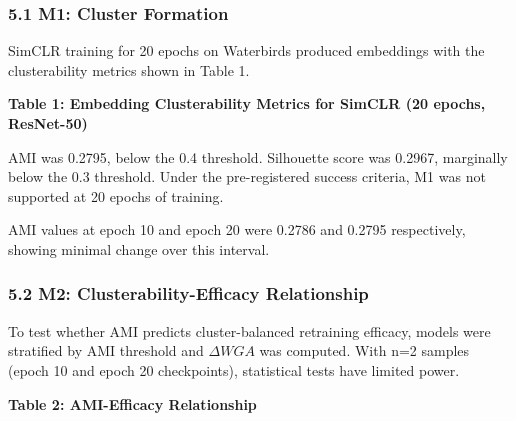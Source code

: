 
\subsubsection{5.1 M1: Cluster Formation}

SimCLR training for 20 epochs on Waterbirds produced embeddings with the clusterability metrics shown in Table 1.

\textbf{Table 1: Embedding Clusterability Metrics for SimCLR (20 epochs, ResNet-50)}

\begin{table}[htbp]
\centering
{}
\end{table}

AMI was 0.2795, below the 0.4 threshold. Silhouette score was 0.2967, marginally below the 0.3 threshold. Under the pre-registered success criteria, M1 was not supported at 20 epochs of training.

AMI values at epoch 10 and epoch 20 were 0.2786 and 0.2795 respectively, showing minimal change over this interval.

\subsubsection{5.2 M2: Clusterability-Efficacy Relationship}

To test whether AMI predicts cluster-balanced retraining efficacy, models were stratified by AMI threshold and $\Delta WGA$ was computed. With n=2 samples (epoch 10 and epoch 20 checkpoints), statistical tests have limited power.

\textbf{Table 2: AMI-Efficacy Relationship}

\begin{table}[htbp]
\centering
{}
\end{table}

